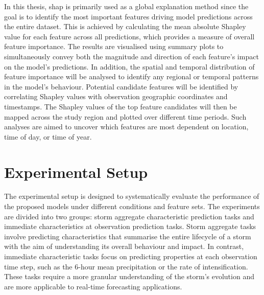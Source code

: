 In this thesis, \acrshort{shap} is primarily used as a global explanation method since the goal is to identify the most important features driving model predictions across the entire dataset. This is achieved by calculating the mean absolute Shapley value for each feature across all predictions, which provides a measure of overall feature importance. The results are visualised using summary plots to simultaneously convey both the magnitude and direction of each feature's impact on the model's predictions. In addition, the spatial and temporal distribution of feature importance will be analysed to identify any regional or temporal patterns in the model's behaviour. Potential candidate features will be identified by correlating Shapley values with observation geographic coordinates and timestamps. The Shapley values of the top feature candidates will then be mapped across the study region and plotted over different time periods. Such analyses are aimed to uncover which features are most dependent on location, time of day, or time of year.

\section{Experimental Setup}
\label{sec:experimental-setup}

The experimental setup is designed to systematically evaluate the performance of the proposed models under different conditions and feature sets. The experiments are divided into two groups: storm aggregate characteristic prediction tasks and immediate characteristics at observation prediction tasks. Storm aggregate tasks involve predicting characteristics that summarise the entire lifecycle of a storm with the aim of understanding its overall behaviour and impact. In contrast, immediate characteristic tasks focus on predicting properties at each observation time step, such as the 6-hour mean precipitation or the rate of intensification. These tasks require a more granular understanding of the storm's evolution and are more applicable to real-time forecasting applications.

